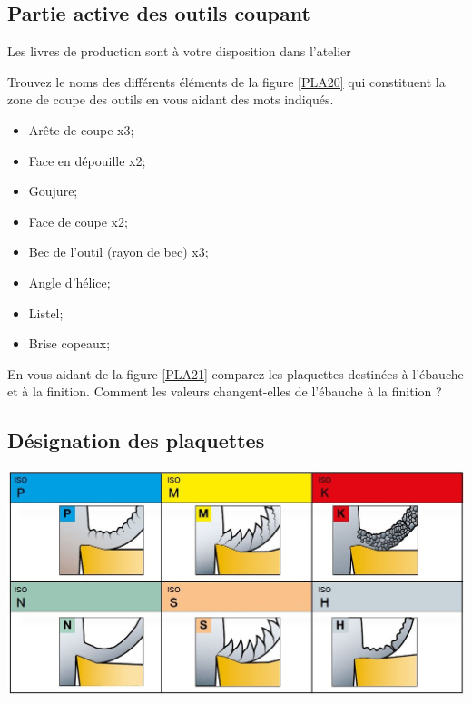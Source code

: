 \documentclass[12pt]{article}
\newcounter{exo}
\newenvironment{exo}{\stepcounter{exo}\vspace{0.5cm}{\bfseries Question \theexo\ :}}{\par\vspace{0.5cm}}
\begin{document}
\subsection{Partie active des outils coupant}

\begin{tcolorbox}[colback=blue!5!white,colframe=red!75!black]
  \bcinfo Les livres de production sont à votre disposition dans l'atelier
\end{tcolorbox}

\begin{exo} Trouvez le noms des différents éléments de la figure \ref{PLA20} qui constituent la zone de coupe des outils en vous aidant des mots indiqués.\end{exo}

\begin{minipage}{.55\linewidth}
\begin{itemize}
    \item Arête de coupe x3;
    \item Face en dépouille x2; 
    \item Goujure;
    \item Face de coupe x2;
\end{itemize} 
\end{minipage}
\begin{minipage}{.44\linewidth}
\begin{itemize}
    \item Bec de l'outil (rayon de bec) x3;
    \item Angle d'hélice;
    \item Listel;
    \item Brise copeaux;
\end{itemize} 
\end{minipage}


\begin{exo} En vous aidant de la figure \ref{PLA21} comparez les plaquettes destinées à l'ébauche et à la finition. Comment les valeurs changent-elles de l'ébauche à la finition ?\end{exo}


\newpage

\subsection{Désignation des plaquettes}

\begin{center}
\includegraphics[width=0.7\linewidth]{Images/PLA1.JPG}
\end{center}
\end{document}

